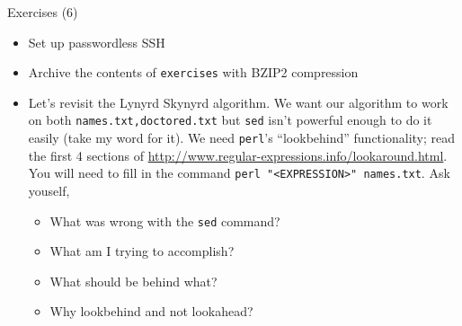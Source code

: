 \documentclass[hyperref={pdfpagelabels=false},12pt]{beamer}
\begin{document}
\begin{frame}[label=exercises-6]{Exercises (6)}
\begin{itemize}
    \item Set up passwordless SSH
    \item Archive the contents of \texttt{exercises} with BZIP2 compression
    \item Let's revisit the Lynyrd Skynyrd algorithm. We want our algorithm to
    work on both \texttt{names.txt,doctored.txt} but \texttt{sed} isn't
    powerful enough to do it easily (take my word for it). We need
    \texttt{perl}'s ``lookbehind'' functionality; read the first 4 sections of
    \url{http://www.regular-expressions.info/lookaround.html}. You will need to
    fill in the command \texttt{perl "<EXPRESSION>" names.txt}. Ask youself,
    \begin{itemize}
        \item What was wrong with the \texttt{sed} command?
        \item What am I trying to accomplish?
        \item What should be behind what?
        \item Why lookbehind and not lookahead?
    \end{itemize}
\end{itemize}
\end{frame}
\end{document}
